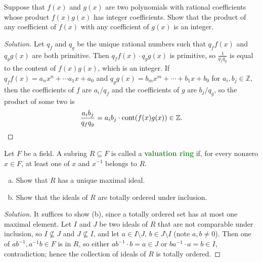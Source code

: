 \documentclass[10pt]{article}
\providecommand{\ZZ}{\mathbb Z}
\providecommand{\ii}{\item}
\providecommand{\inv}{^{-1}}
\newenvironment{soln}{\begin{proof}[Solution]}{\end{proof}}
\providecommand{\vocab}[1]{{\textbf{\textcolor{ForestGreen}{#1}}}}
\begin{document}
\begin{problem}
    Suppose that $f(x)$ and $g(x)$ are two polynomials
    with rational coefficients whose product $f(x)g(x)$ has integer coefficients.
    Show that the product of any coefficient of $f(x)$
    with any coefficient of $g(x)$ is an integer.
\end{problem}

\begin{soln}
    Let $q_f$ and $q_g$ be the unique rational numbers
    such that $q_ff(x)$ and $q_gg(x)$ are both primitive.
    Then $q_ff(x)\cdot q_gg(x)$ is primitive, so
    $\frac 1{q_fq_g}$ is equal to the content of $f(x)g(x)$, which is an integer.
    If $q_ff(x) = a_nx^n + \cdots a_1x + a_0$ and
    $q_gg(x) = b_mx^m + \cdots + b_1x + b_0$ for $a_i,b_j\in\ZZ$, then
    the coefficients of $f$ are $a_i/q_f$ and the coefficients of $g$ are
    $b_j/q_g$, so the product of some two is
    \begin{equation*}
	\frac{a_ib_j}{q_fq_g} = a_ib_j\cdot\operatorname{cont}(f(x)g(x))\in\ZZ.\qedhere
    \end{equation*}
\end{soln}

\begin{problem}
    Let $F$ be a field. A subring $R\subseteq F$ is called
    a \vocab{valuation ring} if, for every nonzero $x\in F$,
    at least one of $x$ and $x\inv$ belongs to $R$.
    \begin{enumerate}[(a)]
        \ii Show that $R$ has a unique maximal ideal.
	\ii Show that the ideals of $R$ are totally ordered under inclusion.
    \end{enumerate}
\end{problem}

\begin{soln}
    It suffices to show (b), since a totally ordered set has
    at most one maximal element.
    Let $I$ and $J$ be two ideals of $R$ that are not comparable under inclusion,
    so $I\not\subseteq J$ and $J\not\subseteq I$,
    and let $a\in I\setminus J$, $b\in J\setminus I$ (note $a,b\ne 0$).
    Then one of $ab\inv,a\inv b\in F$ is in $R$,
    so  either $ab\inv\cdot b = a\in J$ or
    $ba\inv\cdot a = b\in I$, contradiction;
    hence the collection of ideals of $R$ is totally ordered.
\end{soln}
\end{document}
